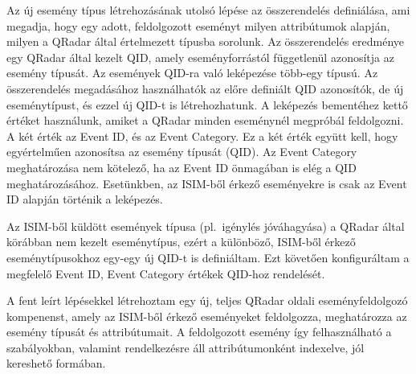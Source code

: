 Az új esemény típus létrehozásának utolsó lépése az összerendelés definiálása, ami megadja, hogy egy adott, feldolgozott eseményt milyen attribútumok alapján, milyen a QRadar által értelmezett típusba sorolunk. Az összerendelés eredménye egy QRadar által kezelt QID, amely eseményforrástól függetlenül azonosítja az esemény típusát. Az események QID-ra való leképezése több-egy típusú. Az összerendelés megadásához használhatók az előre definiált QID azonosítók, de új eseménytípust, és ezzel új QID-t is létrehozhatunk. A leképezés bementéhez kettő értéket használunk, amiket a QRadar minden eseménynél megpróbál feldolgozni. A két érték az Event ID, és az Event Category. Ez a két érték együtt kell, hogy egyértelműen azonosítsa az esemény típusát (QID). Az Event Category meghatározása nem kötelező, ha az Event ID önmagában is elég a QID meghatározásához. Esetünkben, az ISIM-ből érkező eseményekre is csak az Event ID alapján történik a leképezés.

Az ISIM-ből küldött események típusa (pl.~igénylés jóváhagyása) a QRadar által körábban nem kezelt eseménytípus, ezért a különböző, ISIM-ből érkező eseménytípusokhoz egy-egy új QID-t is definiáltam. Ezt követően konfiguráltam a megfelelő Event ID, Event Category értékek QID-hoz rendelését.

A fent leírt lépésekkel létrehoztam egy új, teljes QRadar oldali eseményfeldolgozó kompenenst, amely az ISIM-ből érkező eseményeket feldolgozza, meghatározza az esemény típusát és attribútumait. A feldolgozott esemény így felhasználható a szabályokban, valamint rendelkezésre áll attribútumonként indexelve, jól kereshető formában.

